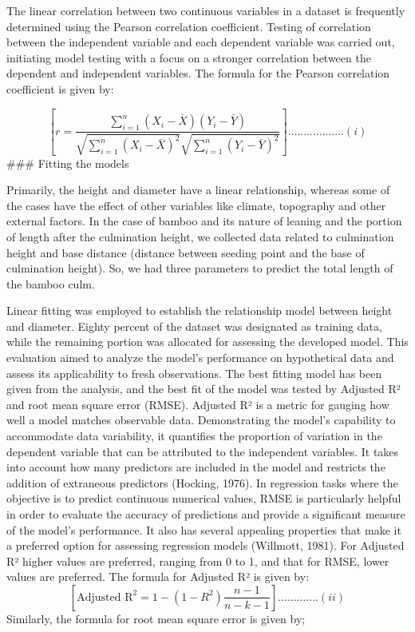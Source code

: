 \documentclass[preprint, 3p,
authoryear]{elsarticle} %
\begin{document}
The linear correlation between two continuous variables in a dataset is
frequently determined using the Pearson correlation coefficient. Testing
of correlation between the independent variable and each dependent
variable was carried out, initiating model testing with a focus on a
stronger correlation between the dependent and independent variables.
The formula for the Pearson correlation coefficient is given by:

\[[ r = \frac{{\sum_{i=1}^{n} (X_i - \bar{X})(Y_i - \bar{Y})}}{{\sqrt{\sum_{i=1}^{n} (X_i - \bar{X})^2} \sqrt{\sum_{i=1}^{n} (Y_i - \bar{Y})^2}}} ]..................                          (i)\]
\#\#\# Fitting the models

Primarily, the height and diameter have a linear relationship, whereas
some of the cases have the effect of other variables like climate,
topography and other external factors. In the case of bamboo and its
nature of leaning and the portion of length after the culmination
height, we collected data related to culmination height and base
distance (distance between seeding point and the base of culmination
height). So, we had three parameters to predict the total length of the
bamboo culm.

Linear fitting was employed to establish the relationship model between
height and diameter. Eighty percent of the dataset was designated as
training data, while the remaining portion was allocated for assessing
the developed model. This evaluation aimed to analyze the model's
performance on hypothetical data and assess its applicability to fresh
observations. The best fitting model has been given from the analysis,
and the best fit of the model was tested by Adjusted R² and root mean
square error (RMSE). Adjusted R² is a metric for gauging how well a
model matches observable data. Demonstrating the model's capability to
accommodate data variability, it quantifies the proportion of variation
in the dependent variable that can be attributed to the independent
variables. It takes into account how many predictors are included in the
model and restricts the addition of extraneous predictors (Hocking,
1976). In regression tasks where the objective is to predict continuous
numerical values, RMSE is particularly helpful in order to evaluate the
accuracy of predictions and provide a significant measure of the model's
performance. It also has several appealing properties that make it a
preferred option for assessing regression models (Willmott, 1981). For
Adjusted R² higher values are preferred, ranging from 0 to 1, and that
for RMSE, lower values are preferred. The formula for Adjusted R² is
given by:
\[[\text{Adjusted R}^2 = 1 - \left(1 - R^2\right) \frac{n - 1}{n - k - 1}].............(ii)\]
Similarly, the formula for root mean square error is given by;
\end{document}
